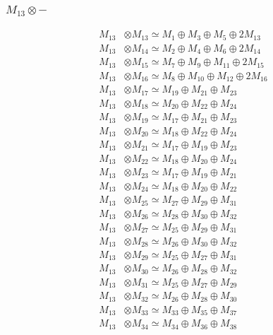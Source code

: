 \subsubsection{$ M_{13}\otimes -$}
\begin{align*}
M_{13} &\otimes M_{13} \simeq M_{1} \oplus M_{3} \oplus M_{5} \oplus 2M_{13} \\
M_{13} &\otimes M_{14} \simeq M_{2} \oplus M_{4} \oplus M_{6} \oplus 2M_{14} \\
M_{13} &\otimes M_{15} \simeq M_{7} \oplus M_{9} \oplus M_{11} \oplus 2M_{15} \\
M_{13} &\otimes M_{16} \simeq M_{8} \oplus M_{10} \oplus M_{12} \oplus 2M_{16} \\
M_{13} &\otimes M_{17} \simeq M_{19} \oplus M_{21} \oplus M_{23} \\
M_{13} &\otimes M_{18} \simeq M_{20} \oplus M_{22} \oplus M_{24} \\
M_{13} &\otimes M_{19} \simeq M_{17} \oplus M_{21} \oplus M_{23} \\
M_{13} &\otimes M_{20} \simeq M_{18} \oplus M_{22} \oplus M_{24} \\
M_{13} &\otimes M_{21} \simeq M_{17} \oplus M_{19} \oplus M_{23} \\
M_{13} &\otimes M_{22} \simeq M_{18} \oplus M_{20} \oplus M_{24} \\
M_{13} &\otimes M_{23} \simeq M_{17} \oplus M_{19} \oplus M_{21} \\
M_{13} &\otimes M_{24} \simeq M_{18} \oplus M_{20} \oplus M_{22} \\
M_{13} &\otimes M_{25} \simeq M_{27} \oplus M_{29} \oplus M_{31} \\
M_{13} &\otimes M_{26} \simeq M_{28} \oplus M_{30} \oplus M_{32} \\
M_{13} &\otimes M_{27} \simeq M_{25} \oplus M_{29} \oplus M_{31} \\
M_{13} &\otimes M_{28} \simeq M_{26} \oplus M_{30} \oplus M_{32} \\
M_{13} &\otimes M_{29} \simeq M_{25} \oplus M_{27} \oplus M_{31} \\
M_{13} &\otimes M_{30} \simeq M_{26} \oplus M_{28} \oplus M_{32} \\
M_{13} &\otimes M_{31} \simeq M_{25} \oplus M_{27} \oplus M_{29} \\
M_{13} &\otimes M_{32} \simeq M_{26} \oplus M_{28} \oplus M_{30} \\
M_{13} &\otimes M_{33} \simeq M_{33} \oplus M_{35} \oplus M_{37} \\
M_{13} &\otimes M_{34} \simeq M_{34} \oplus M_{36} \oplus M_{38} \\

\end{align*}
